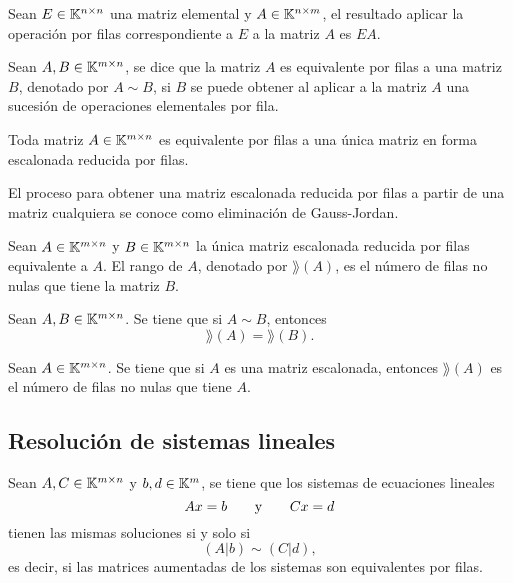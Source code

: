 \documentclass[a4,11pt]{aleph-notas}
\begin{document}
\begin{teo}
    Sean $E\in \Mat[\K]{n}{n}$ una matriz elemental y $A\in\Mat[\K]{n}{m}$, el resultado aplicar la operación por filas correspondiente a $E$ a la matriz $A$ es $EA$.
\end{teo}

\begin{defi}
    Sean $A,B\in \Mat[\K]{m}{n}$, se dice que la matriz $A$ es equivalente por filas a una matriz $B$, denotado por $A\sim B$, si $B$ se puede obtener al aplicar a la matriz $A$ una sucesión de operaciones elementales por fila.
\end{defi}

\begin{teo}
    Toda matriz $A\in\Mat[\K]{m}{n}$ es equivalente por filas a una única matriz en forma escalonada reducida por filas. 
\end{teo}

\begin{advertencia}
    El proceso para obtener una matriz escalonada reducida por filas a partir de una matriz cualquiera se conoce como eliminación de Gauss-Jordan.
\end{advertencia}

\begin{defi}
    Sean $A\in\Mat[\K]{m}{n}$ y $B\in\Mat[\K]{m}{n}$ la única matriz escalonada reducida por filas equivalente a $A$. El rango de $A$, denotado por $\rang(A)$, es el número de filas no nulas que tiene la matriz $B$.  
\end{defi}

\begin{prop}
    Sean $A, B\in\Mat[\K]{m}{n}$. Se tiene que si $A\sim B$, entonces 
    \[
        \rang(A) = \rang(B).
    \]
\end{prop}

\begin{prop}
    Sean $A\in\Mat[\K]{m}{n}$. Se tiene que si $A$ es una matriz escalonada, entonces $\rang(A)$ es el número de filas no nulas que tiene $A$.
\end{prop}

\subsection{Resolución de sistemas lineales}

\begin{teo}
    Sean $A,C\in \Mat[\K]{m}{n}$ y $b,d\in \K^m$, se tiene que los sistemas de ecuaciones lineales
    \[
        Ax=b
        \texty
        Cx=d
    \]
    tienen las mismas soluciones si y solo si
    \[
        (A|b)\sim (C|d),
    \]
    es decir, si las matrices aumentadas de los sistemas son equivalentes por filas. 
\end{teo}
\end{document}
